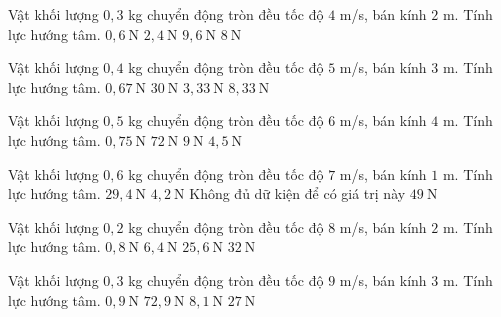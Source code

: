 \begin{ex}
Vật khối lượng $0,3$ kg chuyển động tròn đều tốc độ $4$ m/s, bán kính $2$ m. Tính lực hướng tâm.
\choice
{$0,6\ \mathrm{N}$}
{\True $2,4\ \mathrm{N}$}
{$9,6\ \mathrm{N}$}
{$8\ \mathrm{N}$}
\end{ex}

\begin{ex}
Vật khối lượng $0,4$ kg chuyển động tròn đều tốc độ $5$ m/s, bán kính $3$ m. Tính lực hướng tâm.
\choice
{$0,67\ \mathrm{N}$}
{$30\ \mathrm{N}$}
{\True $3,33\ \mathrm{N}$}
{$8,33\ \mathrm{N}$}
\end{ex}

\begin{ex}
Vật khối lượng $0,5$ kg chuyển động tròn đều tốc độ $6$ m/s, bán kính $4$ m. Tính lực hướng tâm.
\choice
{$0,75\ \mathrm{N}$}
{$72\ \mathrm{N}$}
{$9\ \mathrm{N}$}
{\True $4,5\ \mathrm{N}$}
\end{ex}

\begin{ex}
Vật khối lượng $0,6$ kg chuyển động tròn đều tốc độ $7$ m/s, bán kính $1$ m. Tính lực hướng tâm.
\choice
{\True $29,4\ \mathrm{N}$}
{$4,2\ \mathrm{N}$}
{Không đủ dữ kiện để có giá trị này}
{$49\ \mathrm{N}$}
\end{ex}

\begin{ex}
Vật khối lượng $0,2$ kg chuyển động tròn đều tốc độ $8$ m/s, bán kính $2$ m. Tính lực hướng tâm.
\choice
{$0,8\ \mathrm{N}$}
{\True $6,4\ \mathrm{N}$}
{$25,6\ \mathrm{N}$}
{$32\ \mathrm{N}$}
\end{ex}

\begin{ex}
Vật khối lượng $0,3$ kg chuyển động tròn đều tốc độ $9$ m/s, bán kính $3$ m. Tính lực hướng tâm.
\choice
{$0,9\ \mathrm{N}$}
{$72,9\ \mathrm{N}$}
{\True $8,1\ \mathrm{N}$}
{$27\ \mathrm{N}$}
\end{ex}

